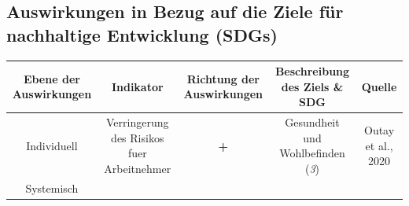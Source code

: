 \documentclass[
]{book}
\begin{document}
\hypertarget{auswirkungen-in-bezug-auf-die-ziele-fuxfcr-nachhaltige-entwicklung-sdgs-7}{%
\subsection*{Auswirkungen in Bezug auf die Ziele für nachhaltige Entwicklung (SDGs)}\label{auswirkungen-in-bezug-auf-die-ziele-fuxfcr-nachhaltige-entwicklung-sdgs-7}}

\begin{longtable}[]{@{}ccccc@{}}
\toprule
\begin{minipage}[b]{0.17\columnwidth}\centering
Ebene der Auswirkungen\strut
\end{minipage} & \begin{minipage}[b]{0.16\columnwidth}\centering
Indikator\strut
\end{minipage} & \begin{minipage}[b]{0.17\columnwidth}\centering
Richtung der Auswirkungen\strut
\end{minipage} & \begin{minipage}[b]{0.17\columnwidth}\centering
Beschreibung des Ziels \& SDG\strut
\end{minipage} & \begin{minipage}[b]{0.17\columnwidth}\centering
Quelle\strut
\end{minipage}\tabularnewline
\midrule
\endhead
\begin{minipage}[t]{0.17\columnwidth}\centering
Individuell\strut
\end{minipage} & \begin{minipage}[t]{0.16\columnwidth}\centering
Verringerung des Risikos fuer Arbeitnehmer\strut
\end{minipage} & \begin{minipage}[t]{0.17\columnwidth}\centering
\textbf{+}\strut
\end{minipage} & \begin{minipage}[t]{0.17\columnwidth}\centering
Gesundheit und Wohlbefinden (\emph{3})\strut
\end{minipage} & \begin{minipage}[t]{0.17\columnwidth}\centering
Outay et al., 2020\strut
\end{minipage}\tabularnewline
\begin{minipage}[t]{0.17\columnwidth}\centering
Systemisch\strut
\end{minipage} & \begin{minipage}[t]{0.16\columnwidth}\centering

\end{minipage}
\end{longtable}
\end{document}
